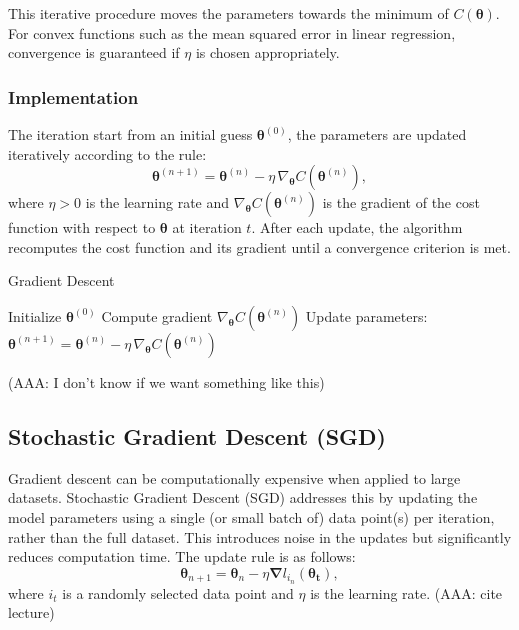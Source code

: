 \documentclass[
 reprint,            %
 amsmath,amssymb,
 aps,
]{revtex4-2}
\begin{document}
This iterative procedure moves the parameters towards the minimum of $C(\boldsymbol{\theta})$. For convex functions such as the mean squared error in linear regression, convergence is guaranteed if $\eta$ is chosen appropriately.

\subsubsection{Implementation}
The iteration start from an initial guess $\boldsymbol{\theta}^{(0)}$, the parameters are updated iteratively according to the rule:
\[
\boldsymbol{\theta}^{(n+1)} = \boldsymbol{\theta}^{(n)} - \eta \, \nabla_{\boldsymbol{\theta}} C(\boldsymbol{\theta}^{(n)}),
\]
where $\eta > 0$ is the learning rate and $\nabla_{\boldsymbol{\theta}} C(\boldsymbol{\theta}^{(n)})$ is the gradient of the cost function with respect to $\boldsymbol{\theta}$ at iteration $t$.
After each update, the algorithm recomputes the cost function and its gradient until a convergence criterion is met.\\

\begin{algorithm}[H]
\caption{Gradient Descent}
\begin{algorithmic}[1]
\State Initialize $\boldsymbol{\theta}^{(0)}$
    \State Compute gradient $\nabla_{\boldsymbol{\theta}} C(\boldsymbol{\theta}^{(n)})$
    \State Update parameters: 
    $\boldsymbol{\theta}^{(n+1)} = \boldsymbol{\theta}^{(n)} - \eta \, \nabla_{\boldsymbol{\theta}} C(\boldsymbol{\theta}^{(n)})$
\EndFor
\end{algorithmic}
\end{algorithm}

(AAA: I don't know if we want something like this)

\subsection{Stochastic Gradient Descent (SGD)}
Gradient descent can be computationally expensive when applied to large datasets.
Stochastic Gradient Descent (SGD) addresses this by updating the model parameters using a single (or small batch of) data point(s) per iteration, rather than the full dataset\cite{hjorthjensen_week37}.
This introduces noise in the updates but significantly reduces computation time.
The update rule is as follows:  
$$
\boldsymbol{\theta}_{n+1} = \boldsymbol{\theta}_n - {\eta \boldsymbol{\nabla}} l_{i_n} (\boldsymbol{\theta_t}),
$$  
where \(i_t\) is a randomly selected data point and \(\eta\) is the learning rate. (AAA: cite lecture)\\
\end{document}
